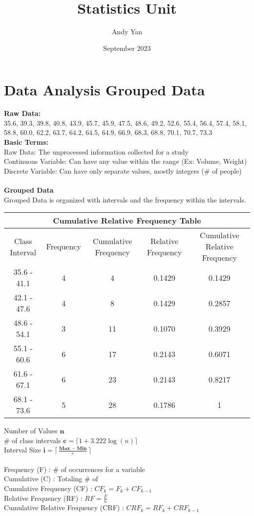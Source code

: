\documentclass{article}
\title{Statistics Unit}
\author{Andy Yan}
\date{September 2023}
\begin{document}
\maketitle

\section{Data Analysis Grouped Data}

\large\textbf{Raw Data:}\\
35.6,  39.3,  39.8,  40.8,  43.9,  45.7,  45.9,  47.5,  48.6,  49.2,  52.6,  55.4,  56.4,  57.4,  58.1,  58.8,  60.0,  62.2,  63.7,  64.2,  64.5,  64.9,  66.9,  68.3,  68.8,  70.1,  70.7,  73.3\\

\normalsize
\noindent
\textbf{Basic Terms:}\\
Raw Data: The unprocessed information collected for a study\\
Continuous Variable: Can have any value within the range (Ex: Volume, Weight)\\
Discrete Variable: Can have only separate values, mostly integers (\# of people)\\\\
\textbf{Grouped Data}\\
Grouped Data is organized with intervals and the frequency within the intervals.

\begin{center}
\def\arraystretch{1}
\begin{tabular}{| c | c | c | c | c |} 
\hline
\multicolumn{5}{|c|}{Cumulative Relative Frequency Table} \\
 \hline
   Class Interval & Frequency & Cumulative Frequency & Relative Frequency & Cumulative Relative Frequency\\
 \hline
35.6 - 41.1 & 4 & 4 & 0.1429 & 0.1429\\
 \hline
42.1 - 47.6	& 4 & 8 & 0.1429 & 0.2857\\
 \hline
48.6 - 54.1	& 3 & 11 & 0.1070 & 0.3929\\
 \hline
55.1 - 60.6	& 6 & 17 & 0.2143 & 0.6071\\
 \hline
61.6 - 67.1	& 6 & 23 & 0.2143 & 0.8217\\
 \hline
 68.1 - 73.6	& 5 & 28 & 0.1786 & 1\\
  \hline
\end{tabular}
\end{center}

Number of Values \(\textbf{n}\)\\
\# of class intervals \(\textbf{c} = \lceil 1 + 3.222\log(n)\rceil\)\\
Interval Size \(\textbf{i} = \lceil \frac{\textbf{Max } - \textbf{ Min}}{c}\rceil\)\\\\
Frequency (F) : \# of occurrences for a variable\\
Cumulative (C) : Totaling \# of\\
Cumulative Frequency (CF) : \(CF_k = F_k + CF_{k-1}\)\\
Relative Frequency (RF) : \(RF = \frac{F}{n}\)\\
Cumulative Relative Frequency (CRF) : \(CRF_k = RF_k + CRF_{k-1}\)
\end{document}
